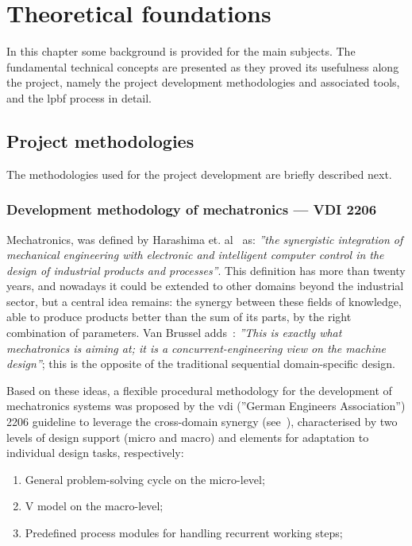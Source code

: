 %
%

\chapter{Theoretical foundations}
\label{ch:theor-found}
In this chapter some background is provided for the main subjects. The
fundamental technical concepts are presented as they proved its usefulness along
the project, namely the project development methodologies and associated tools,
and the \gls{lpbf} process in detail.
%
%
%
\section{Project methodologies}
The methodologies used for the project development are briefly described next.
%
%

\subsection{Development methodology of mechatronics --- VDI 2206}%
\label{subsec:vdi-2206}
Mechatronics, was defined by Harashima et. al~\cite{harashima1996mechatronics}
as: \emph{''the synergistic integration of mechanical engineering
with electronic and intelligent computer control in the design of industrial
products and processes''}. This definition has more than twenty years, and
nowadays it could be extended to other domains beyond the industrial sector,
but a central idea remains: the synergy between these fields of knowledge, able
to produce products better than the sum of its parts, by the right combination
of parameters. Van Brussel adds~\cite{van1996mechatronics}: \emph{''This is
exactly what mechatronics is aiming at; it is a concurrent-engineering view on
the machine design''}; this is the opposite of the traditional sequential
domain-specific design. 

Based on these ideas, a flexible procedural methodology for the development of
mechatronics systems was proposed by the \gls{vdi} (''German Engineers
Association'') 2206 guideline to leverage the cross-domain synergy (see~\cite{gausemeier2003new}), characterised by two levels of design support (micro
and macro) and elements for adaptation to individual design tasks, respectively:
\begin{enumerate}
  \item General problem-solving cycle on the micro-level;
  \item V model on the macro-level;
  \item Predefined process modules for handling recurrent working steps;
\end{enumerate}

